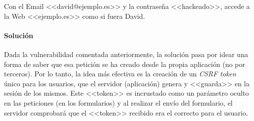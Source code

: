 \begin{tcolorbox}[colback=red!5!white,colframe=red!75!black,title=Atacante]

Con el Email <<david@ejemplo.es>> y la contraseña <<hackeado>>, accede a la Web
<<ejemplo.es>> como si fuera David.

\end{tcolorbox}

\paragraph{Solución} Dada la vulnerabilidad comentada anteriormente, la solución
pasa por idear una forma de saber que esa petición se ha creado desde la propia
aplicación (no por terceros). Por lo tanto, la idea más efectiva es la creación
de un \emph{CSRF token} único para los usuarios, que el servidor
(aplicación) genera y <<guarda>> en la sesión de los mismos. Este <<token>> es
incrustado como un parámetro oculto en las peticiones (en los formularios) y al
realizar el envío del formulario, el servidor comprobará que el <<token>>
recibido era el correcto para el usuario.

